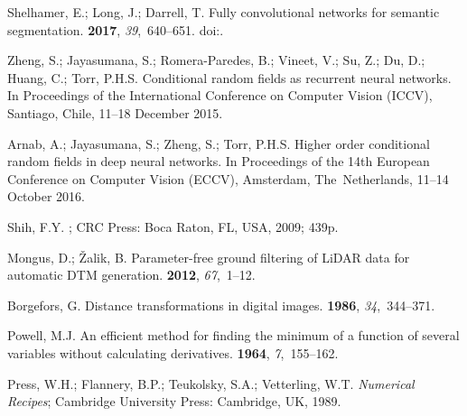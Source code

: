 \documentclass[remotesensing,article,accept,moreauthors,pdftex,10pt,a4paper]{mdpi}
\theoremstyle{mdpi}
\newcounter{re}
\begin{document}
\begin{thebibliography}{999}
Shelhamer, E.; Long, J.; Darrell, T.
\newblock Fully convolutional networks for semantic segmentation.
  {\bf 2017}, {\em 39},~640--651.
\newblock
  doi:{\href{https://doi.org/10.1109/TPAMI.2016.2572683}{}}.

Zheng, S.; Jayasumana, S.; Romera-Paredes, B.; Vineet, V.; Su, Z.; Du, D.;
  Huang, C.; Torr, P.H.S.
\newblock Conditional random fields as recurrent neural networks.
\newblock  In Proceedings of the International Conference on Computer Vision (ICCV), Santiago, Chile, 11--18 December 2015.

Arnab, A.; Jayasumana, S.; Zheng, S.; Torr, P.H.S.
\newblock Higher order conditional random fields in deep neural networks.
\newblock In Proceedings of the 14th European Conference on Computer Vision (ECCV), Amsterdam, The~Netherlands, 11--14 October 2016.

Shih, F.Y.
; CRC Press: Boca Raton, FL, USA, 2009; 439p.

Mongus, D.; Žalik, B.
\newblock Parameter-free ground filtering of LiDAR data for automatic DTM
  generation.
 {\bf 2012},
  {\em 67},~1--12.


Borgefors, G.
\newblock Distance transformations in digital images.
 {\bf 1986},
  {\em 34},~344--371.


Powell, M.J.
\newblock An efficient method for finding the minimum of a function of several
  variables without calculating derivatives.
 {\bf 1964}, {\em 7},~155--162.

Press, W.H.; Flannery, B.P.; Teukolsky, S.A.; Vetterling, W.T.
\newblock \emph{Numerical Recipes}; Cambridge University Press: Cambridge, UK, 1989.


\end{thebibliography}
\end{document}
